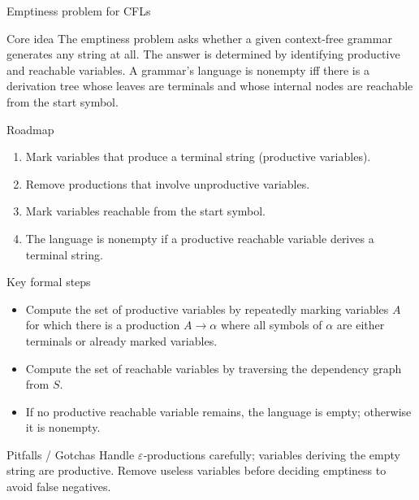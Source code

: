 \begin{frame}[t]{Emptiness problem for CFLs}
  \begin{tblock}{Core idea}
    The emptiness problem asks whether a given context‑free grammar
    generates any string at all.  The answer is determined by
    identifying productive and reachable variables.  A grammar’s
    language is nonempty iff there is a derivation tree whose leaves are
    terminals and whose internal nodes are reachable from the start
    symbol.
  \end{tblock}
  \begin{tblock}{Roadmap}
    \begin{enumerate}
      \item Mark variables that produce a terminal string (productive
        variables).
      \item Remove productions that involve unproductive variables.
      \item Mark variables reachable from the start symbol.
      \item The language is nonempty if a productive reachable variable
        derives a terminal string.
    \end{enumerate}
  \end{tblock}
  \begin{tblock}{Key formal steps}
    \begin{itemize}
      \item Compute the set of productive variables by repeatedly
        marking variables $A$ for which there is a production
        $A \rightarrow \alpha$ where all symbols of $\alpha$ are either
        terminals or already marked variables.
      \item Compute the set of reachable variables by traversing the
        dependency graph from $S$.
      \item If no productive reachable variable remains, the language is
        empty; otherwise it is nonempty.
    \end{itemize}
  \end{tblock}
  \begin{talert}{Pitfalls / Gotchas}
    Handle $\varepsilon$‑productions carefully; variables deriving the
    empty string are productive.  Remove useless variables before
    deciding emptiness to avoid false negatives.
  \end{talert}
  \label{fr:6.3-06}
\end{frame}

